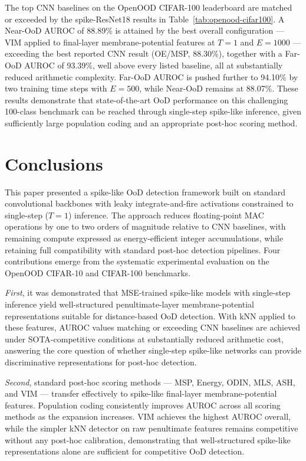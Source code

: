 \documentclass{ieeeaccess}
\begin{document}
The top CNN baselines on the OpenOOD CIFAR-100 leaderboard are matched or exceeded by the spike-ResNet18 results in Table~\ref{tab:openood-cifar100}. A Near-OoD AUROC of 88.89\% is attained by the best overall configuration — VIM applied to final-layer membrane-potential features at $T=1$ and $E=1000$ — exceeding the best reported CNN result (OE/MSP, 88.30\%), together with a Far-OoD AUROC of 93.39\%, well above every listed baseline, all at substantially reduced arithmetic complexity. Far-OoD AUROC is pushed further to 94.10\% by two training time steps with $E=500$, while Near-OoD remains at 88.07\%. These results demonstrate that state-of-the-art OoD performance on this challenging 100-class benchmark can be reached through single-step spike-like inference, given sufficiently large population coding and an appropriate post-hoc scoring method.

\section{Conclusions}
\label{sec:conclusions}

This paper presented a spike-like OoD detection framework built on standard convolutional backbones with leaky integrate-and-fire activations constrained to single-step ($T=1$) inference. The approach reduces floating-point MAC operations by one to two orders of magnitude relative to CNN baselines, with remaining compute expressed as energy-efficient integer accumulations, while retaining full compatibility with standard post-hoc detection pipelines. Four contributions emerge from the systematic experimental evaluation on the OpenOOD CIFAR-10 and CIFAR-100 benchmarks.

\textit{First}, it was demonstrated that MSE-trained spike-like models with single-step inference yield well-structured penultimate-layer membrane-potential representations suitable for distance-based OoD detection. With kNN applied to these features, AUROC values matching or exceeding CNN baselines are achieved under SOTA-competitive conditions at substantially reduced arithmetic cost, answering the core question of whether single-step spike-like networks can provide discriminative representations for post-hoc detection.

\textit{Second}, standard post-hoc scoring methods — MSP, Energy, ODIN, MLS, ASH, and VIM — transfer effectively to spike-like final-layer membrane-potential features. Population coding consistently improves AUROC across all scoring methods as the expansion increases. VIM achieves the highest AUROC overall, while the simpler kNN detector on raw penultimate features remains competitive without any post-hoc calibration, demonstrating that well-structured spike-like representations alone are sufficient for competitive OoD detection.
\end{document}
